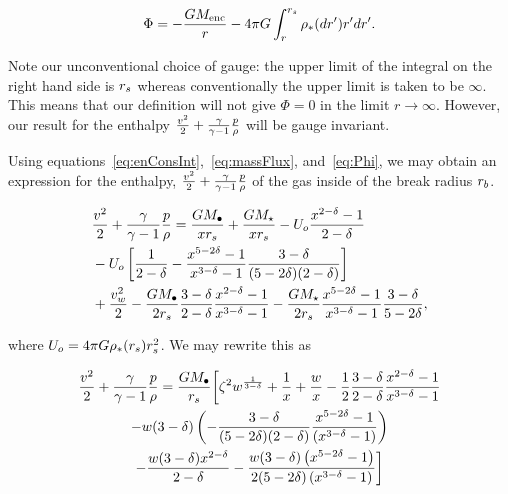 \begin{align}
\Phi= -\frac{G M_{\rm enc}}{r} - 4 \pi G \int_{r}^{r_s} \rho_*(dr') r'
dr'.
\label{eq:Phi}
\end{align}

Note our unconventional choice of gauge: the upper limit of the
integral on the right hand side is $r_s$ whereas conventionally the
upper limit is taken to be $\infty$. This means that our definition
will not give $\Phi=0$ in the limit $r\rightarrow\infty$. However,
our result for the enthalpy $\frac{v^2}{2} + \frac{\gamma}{\gamma-1} \frac{p}{\rho}$ will be
gauge invariant. 

Using equations~\eqref{eq:enConsInt},~\eqref{eq:massFlux},
and~\eqref{eq:Phi}, we may obtain an expression for the enthalpy,
$\frac{v^2}{2}+\frac{\gamma}{\gamma-1} \frac{p}{\rho}$ of the gas inside of the break radius
$r_b$. 

\begin{align}
&\frac{v^2}{2}+\frac{\gamma}{\gamma-1} \frac{p}{\rho} = \frac{G M_{\bullet}}{x r_s} + \frac{G
  M_\star}{x r_s} - U_o \frac{x^{2-\delta}-1}{2-\delta}\nonumber\\
&-U_o\left[\frac{1}{2-\delta}-\frac{x^{5-2\delta}-1}{x^{3-\delta}-1}\frac{3-\delta}{(5-2\delta)(2-\delta)}\right]\nonumber\\
&+\frac{v_w^2}{2}-\frac{G M_{\bullet}}{2 r_s} \frac{3-\delta}{2-\delta}\frac{x^{2-\delta}-1}{x^{3-\delta}-1} -\frac{G M_\star}{2 r_s} \frac{x^{5-2\delta}-1}{x^{3-\delta}-1}\frac{3-\delta}{5-2\delta},
\end{align}

where $U_o=4 \pi G \rho_*(r_s) r_s^2$.  We may rewrite this as 

\begin{multline}
  \frac{v^2}{2}+\frac{\gamma}{\gamma-1} \frac{p}{\rho}=\frac{G M_{\bullet}}{r_s}
  \biggl[\zeta^2 w^{\frac{1}{3 -\delta}}+\frac{1}{x}+\frac{w}{x}
-\frac{1}{2} \frac{3-\delta}{2-\delta} \frac{x^{2 -\delta}-1}{x^{3-\delta}-1}\\
  -w (3 -\delta) \left(-\frac{3-\delta}{(5-2\delta)(2-\delta)}\frac{x^{5 -2 \delta}-1}{ \left(x^{3-\delta}-1\right)}\right)\\
  -\frac{w (3
    -\delta) x^{2 -\delta}}{2
    -\delta}-\frac{w (3 -\delta) \left(x^{5
        -2 \delta}-1\right)}{2 (5 -2 \delta)
    \left(x^{3 -\delta}-1\right)}
  \biggr]
\end{multline}
